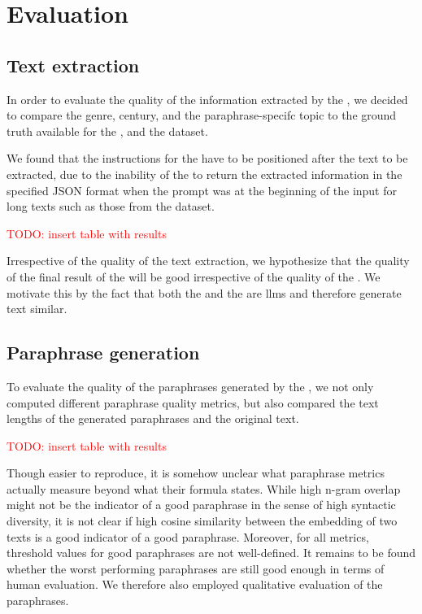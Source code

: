 \chapter{Evaluation}
\label{chap:evaluation}

\section{Text extraction}
\label{sec:text_extraction}

In order to evaluate the quality of the information extracted by the \pextractor{}, 
we decided to compare the genre, century, and the paraphrase-specifc topic to the 
ground truth available for the \dataBlog{}, \dataGutenberg{} and the \dataCustom{} dataset.

We found that the instructions for the \pextractor{} have to be positioned after the text to be extracted, 
due to the inability of the \pextractor{} to return the extracted information in the specified JSON format 
when the prompt was at the beginning of the input for long texts such as those from the \dataGutenberg{} dataset.

\textcolor{red}{TODO: insert table with results}

Irrespective of the quality of the text extraction, we hypothesize that the quality of the final result of the \pgenerator{} will be good irrespective of the quality of the \pextractor{}.
We motivate this by the fact that both the \pextractor{} and the \pgenerator{} are \acp{llm} and therefore generate text similar.

\section{Paraphrase generation}
\label{sec:paraphrase_generation}
To evaluate the quality of the paraphrases generated by the \pgenerator{}, 
we not only computed different paraphrase quality metrics, 
but also compared the text lengths of the generated paraphrases and the original text.

\textcolor{red}{TODO: insert table with results}

Though easier to reproduce, it is somehow unclear what paraphrase metrics actually measure beyond what their formula states.
While high n-gram overlap might not be the indicator of a good paraphrase in the sense of high syntactic diversity, 
it is not clear if high cosine similarity between the embedding of two texts is a good indicator of a good paraphrase.
Moreover, for all metrics, threshold values for good paraphrases are not well-defined.
It remains to be found whether the worst performing paraphrases are still good enough in terms of human evaluation.
We therefore also employed qualitative evaluation of the paraphrases.


